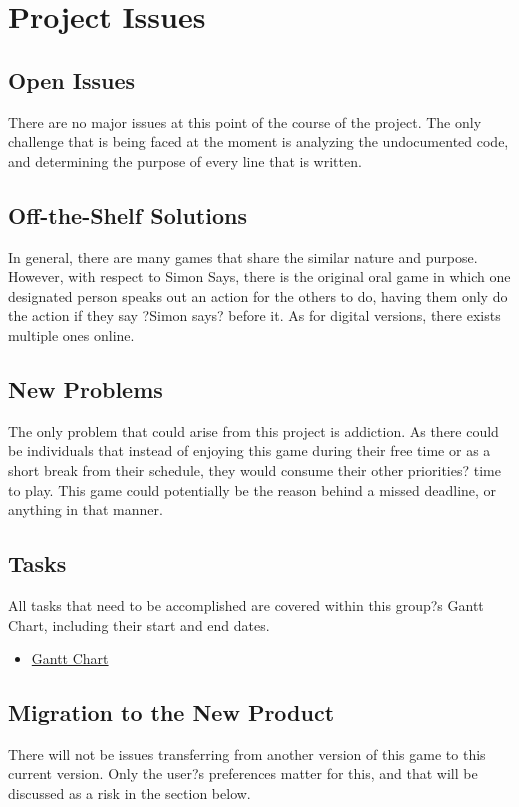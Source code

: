 \documentclass[12pt, titlepage]{article}
\begin{document}
\section{Project Issues}

\subsection{Open Issues}
There are no major issues at this point of the course of the project. The only challenge that is being faced at the moment is analyzing the undocumented code, and determining the purpose of every line that is written.

\subsection{Off-the-Shelf Solutions}
In general, there are many games that share the similar nature and purpose. However, with respect to Simon Says, there is the original oral game in which one designated person speaks out an action for the others to do, having them only do the action if they say ?Simon says? before it. As for digital versions, there exists multiple ones online.

\subsection{New Problems}
The only problem that could arise from this project is addiction. As there could be individuals that instead of enjoying this game during their free time or as a short break from their schedule, they would consume their other priorities? time to play. This game could potentially be the reason behind a missed deadline, or anything in that manner.

\subsection{Tasks}
All tasks that need to be accomplished are covered within this group?s Gantt Chart, including their start and end dates.

\begin{itemize}
\item \href{run:GanttChart.gan} {Gantt Chart}\\
\end{itemize}

\subsection{Migration to the New Product}
There will not be issues transferring from another version of this game to this current version. Only the user?s preferences matter for this, and that will be discussed as a risk in the section below.
\end{document}
